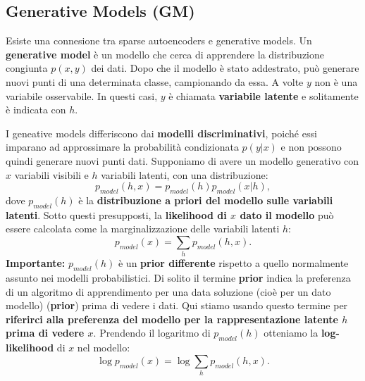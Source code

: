 \subsection{Generative Models (GM)}
Esiste una connesione tra sparse autoencoders e generative models.
Un \textbf{generative model} è un modello che cerca di apprendere la distribuzione congiunta $p(x, y)$ dei 
dati. Dopo che il modello è stato addestrato, può generare nuovi punti di una determinata classe, 
campionando da essa. A volte $y$ non è una variabile osservabile. In questi casi, $y$ è chiamata 
\textbf{variabile latente} e solitamente è indicata con $h$.


I geneative models differiscono dai \textbf{modelli discriminativi}, poiché essi imparano ad approssimare 
la probabilità condizionata $p(y|x)$ e non possono quindi generare nuovi punti dati.
\newline
\newline
Supponiamo di avere un modello generativo con $x$ variabili visibili e $h$ variabili latenti, con una 
distribuzione:
\begin{equation}
  p_{model}(h,x)=p_{model}(h)p_{model}(x|h),
\end{equation}
dove $p_{model}(h)$ è la \textbf{distribuzione a priori del modello sulle variabili latenti}.
\newline
\newline
Sotto questi presupposti, la \textbf{likelihood di $x$ dato il modello} può essere calcolata come la 
marginalizzazione delle variabili latenti $h$:
\begin{equation}
  p_{model}(x)=\sum_hp_{model}(h,x).
\end{equation} 
\newline
\textbf{Importante:} $p_{model}(h)$ è un \textbf{prior differente} rispetto a quello normalmente assunto 
nei modelli probabilistici. Di solito il termine \textbf{prior} indica la preferenza di un algoritmo di 
apprendimento per una data soluzione (cioè per un dato modello) (\textbf{prior}) prima di vedere i dati.
Qui stiamo usando questo termine per \textbf{riferirci alla preferenza del modello per la rappresentazione 
latente $h$ prima di vedere $x$}.
\newline
\newline
Prendendo il logaritmo di $p_{model}(h)$ otteniamo la \textbf{log-likelihood} di $x$ nel modello:
\begin{equation}
  \log{p_{model}(x)}=\log\sum_hp_{model}(h,x). 
\end{equation}
\newline
